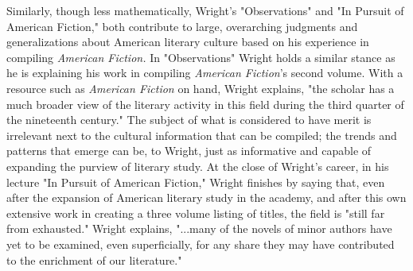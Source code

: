 Similarly, though less mathematically, Wright's "Observations" and "In Pursuit of American Fiction," both contribute to large, overarching judgments and generalizations about American literary culture based on his experience in compiling \textit{American Fiction.} In "Observations" Wright holds a similar stance as he is explaining his work in compiling \textit{American Fiction}'s second volume. With a resource such as \textit{American Fiction} on hand, Wright explains, "the scholar has a much broader view of the literary activity in this field during the third quarter of the nineteenth century."\autocite[75]{wright_few_1955} The subject of what is considered to have merit is irrelevant next to the cultural information that can be compiled; the trends and patterns that emerge can be, to Wright, just as informative and capable of expanding the purview of literary study. At the close of Wright's career, in his lecture "In Pursuit of American Fiction," Wright finishes by saying that, even after the expansion of American literary study in the academy, and after this own extensive work in creating a three volume listing of titles, the field is "still far from exhausted." Wright explains, "...many of the novels of minor authors have yet to be examined, even superficially, for any share they may have contributed to the enrichment of our literature."\autocite[48]{wright_pursuit_1966} 

